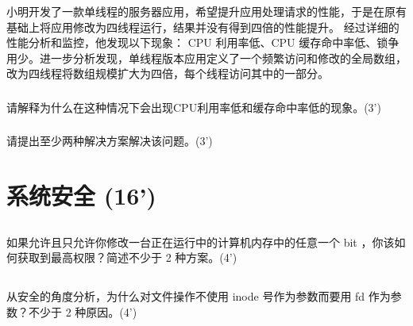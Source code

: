 \documentclass[a4paper,12pt]{article}
\newcommand{\score}[1]{(#1')}
\begin{document}
小明开发了一款单线程的服务器应用，希望提升应用处理请求的性能，于是在原有基础上将应用修改为四线程运行，结果并没有得到四倍的性能提升。
经过详细的性能分析和监控，他发现以下现象： CPU 利用率低、CPU 缓存命中率低、锁争用少。进一步分析发现，单线程版本应用定义了一个频繁访问和修改的全局数组，改为四线程将数组规模扩大为四倍，每个线程访问其中的一部分。

\subsubsection{}

请解释为什么在这种情况下会出现CPU利用率低和缓存命中率低的现象。\score{3}

\begin{answer}
  \lipsum[3]
\end{answer}

\subsubsection{}

请提出至少两种解决方案解决该问题。\score{3}

\begin{answer}
  \lipsum[3]
\end{answer}

\section{系统安全 \score{16}}

\subsection{}

如果允许且只允许你修改一台正在运行中的计算机内存中的任意一个 bit ，你该如何获取到最高权限？简述不少于 2 种方案。\score{4}

\begin{answer}
  \lipsum[3]
\end{answer}

\subsection{}

从安全的角度分析，为什么对文件操作不使用 inode 号作为参数而要用 fd 作为参数？不少于 2 种原因。\score{4}

\begin{answer}
  \lipsum[3]
\end{answer}
\end{document}
